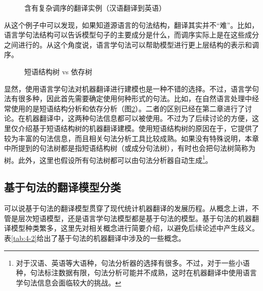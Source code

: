 \begin{figure}[htp]
\centering

\setlength{\belowcaptionskip}{-0.5em}
\caption{含有复杂调序的翻译实例（汉语翻译到英语）}
\label{fig:4-42}
\end{figure}

\parinterval 从这个例子中可以发现，如果知道源语言的句法结构，翻译其实并不``难''。比如，语言学句法结构可以告诉模型句子的主要成分是什么，而调序实际上是在这些成分之间进行的。从这个角度说，语言学句法可以帮助模型进行更上层结构的表示和调序。

\begin{figure}[htp]
\centering

\setlength{\belowcaptionskip}{-1.0em}
\caption{短语结构树 vs 依存树}
\label{fig:4-43}
\end{figure}

\parinterval 显然，使用语言学句法对机器翻译进行建模也是一种不错的选择。不过，语言学句法有很多种，因此首先需要确定使用何种形式的句法。比如，在自然语言处理中经常使用的是短语结构分析和依存分析（图\ref{fig:4-43}）。二者的区别已经在第二章进行了讨论。在机器翻译中，这两种句法信息都可以被使用。不过为了后续讨论的方便，这里仅介绍基于短语结构树的机器翻译建模。使用短语结构树的原因在于，它提供了较为丰富的句法信息，而且相关句法分析工具比较成熟。如果没有特殊说明，本章中所提到的句法树都是指短语结构树（或成分句法树），有时也会把句法树简称为树。此外，这里也假设所有句法树都可以由句法分析器自动生成\footnote[7]{对于汉语、英语等大语种，句法分析器的选择有很多。不过，对于一些小语种，句法标注数据有限，句法分析可能并不成熟，这时在机器翻译中使用语言学句法信息会面临较大的挑战。}。


\subsection{基于句法的翻译模型分类}

\parinterval 可以说基于句法的翻译模型贯穿了现代统计机器翻译的发展历程。从概念上讲，不管是层次短语模型，还是语言学句法模型都是基于句法的模型。基于句法的机器翻译模型种类繁多，这里先对相关概念进行简要介绍，以避免后续论述中产生歧义。表\ref{tab:4-2}给出了基于句法的机器翻译中涉及的一些概念。

